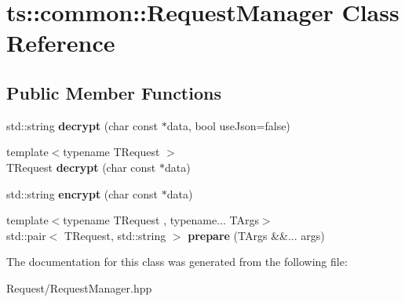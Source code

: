 \hypertarget{classts_1_1common_1_1_request_manager}{}\section{ts\+:\+:common\+:\+:Request\+Manager Class Reference}
\label{classts_1_1common_1_1_request_manager}
\subsection*{Public Member Functions}
\begin{DoxyCompactItemize}
\item 
\mbox{\label{classts_1_1common_1_1_request_manager_ac53eace67600d9436202506a5cc69d5b}} 
std\+::string {\bfseries decrypt} (char const $\ast$data, bool use\+Json=false)
\item 
\mbox{\label{classts_1_1common_1_1_request_manager_aafbf56beca0f2f2ad012b6da012b8a12}} 
{\footnotesize template$<$typename T\+Request $>$ }\\T\+Request {\bfseries decrypt} (char const $\ast$data)
\item 
\mbox{\label{classts_1_1common_1_1_request_manager_a163e44a6f4366e6fbe91683a0cc6241f}} 
std\+::string {\bfseries encrypt} (char const $\ast$data)
\item 
\mbox{\label{classts_1_1common_1_1_request_manager_aac5356f79cf45121bad8243a51350995}} 
{\footnotesize template$<$typename T\+Request , typename... T\+Args$>$ }\\std\+::pair$<$ T\+Request, std\+::string $>$ {\bfseries prepare} (T\+Args \&\&... args)
\end{DoxyCompactItemize}


The documentation for this class was generated from the following file\+:\begin{DoxyCompactItemize}
\item 
Request/Request\+Manager.\+hpp\end{DoxyCompactItemize}
